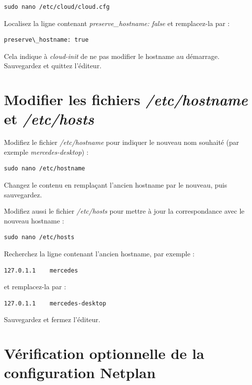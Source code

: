 \begin{lstlisting}[style=commandstyle]
sudo nano /etc/cloud/cloud.cfg
\end{lstlisting}

Localisez la ligne contenant \textit{preserve\_hostname: false} et remplacez-la par :

\begin{lstlisting}[style=commandstyle]
preserve\_hostname: true
\end{lstlisting}

Cela indique à \textit{cloud-init} de ne pas modifier le hostname au démarrage. Sauvegardez et quittez l'éditeur.


\section{Modifier les fichiers \textit{/etc/hostname} et \textit{/etc/hosts}}

Modifiez le fichier \textit{/etc/hostname} pour indiquer le nouveau nom souhaité (par exemple \textit{mercedes-desktop}) :

\begin{lstlisting}[style=commandstyle]
sudo nano /etc/hostname
\end{lstlisting}

Changez le contenu en remplaçant l'ancien hostname par le nouveau, puis sauvegardez.

Modifiez aussi le fichier \textit{/etc/hosts} pour mettre à jour la correspondance avec le nouveau hostname :

\begin{lstlisting}[style=commandstyle]
sudo nano /etc/hosts
\end{lstlisting}

Recherchez la ligne contenant l'ancien hostname, par exemple :

\begin{lstlisting}[style=commandstyle]
127.0.1.1    mercedes
\end{lstlisting}

et remplacez-la par :

\begin{lstlisting}[style=commandstyle]
127.0.1.1    mercedes-desktop
\end{lstlisting}

Sauvegardez et fermez l'éditeur.


\section{Vérification optionnelle de la configuration Netplan}

